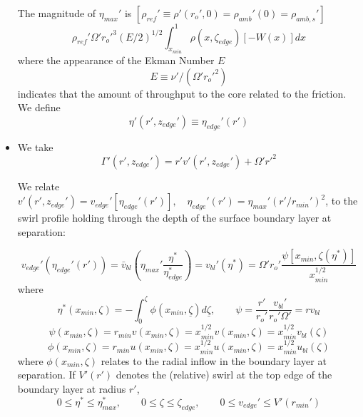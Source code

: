 \documentclass[preprint, prX]{revtex4}
\newcommand{\rmin}{r_{min}}
\newcommand{\xmin}{x_{min}}
\newcommand{\zedge}{z_{edge}}
\begin{document}
\begin{itemize}
The magnitude of $\eta_{max}'$ is $[\rho_{ref}'\equiv \rho'(r_o',0)=\rho_{amb}'(0) = \rho_{amb,s}']$
\begin{equation}
\rho_{ref}'\Omega'r_o'^3 (E/2)^{1/2} \int_{\xmin}^1 \rho(x,\zeta_{edge})[-W(x)]dx
\end{equation}
where the appearance of the Ekman Number $E$
\begin{equation}
E \equiv \nu'/(\Omega'r_o'^2)
\end{equation}
indicates that the amount of throughput to the core related to the friction. We define
\begin{equation}
\eta'(r',\zedge') \equiv \eta_{edge}'(r')
\end{equation}

\item
We take
\begin{equation}
\Gamma'(r',\zedge') = r'v'(r',\zedge') + \Omega'r'^2
\end{equation}

We relate $v'(r',\zedge') = v_{edge}'[\eta_{edge}'(r')], \quad \eta_{edge}'(r') = \eta_{max}'(r' / \rmin')^2$, to the swirl profile holding through the depth of the surface boundary layer at separation:

\begin{equation}
v_{edge}'(\eta_{edge}'(r')) = \bar{v}_{bl}\left( \eta_{max}'\frac{\eta^*}{\eta_{edge}^*}\right) = v_{bl}'(\eta^*) = \Omega' r_o' \frac{\psi[\xmin, \zeta(\eta^*)]}{\xmin^{1/2}}
\end{equation}
where
\begin{equation}
\eta^*(\xmin,\zeta) = -\int_0^\zeta \phi(\xmin,\underline{\zeta})d \underline{\zeta}, \qquad \psi = \frac{r'}{r_o'}\frac{v_{bl}'}{r_o' \Omega'}= r v_{bl}
\end{equation}
\begin{equation}
\psi(\xmin, \zeta) = \rmin v(\xmin,\zeta) = \xmin^{1/2} v(\xmin,\zeta) = \xmin^{1/2} v_{bl} (\zeta)
\end{equation}
\begin{equation}
\phi(\xmin,\zeta) = \rmin u(\xmin, \zeta)  = \xmin^{1/2} u(\xmin, \zeta) = \xmin^{1/2} u_{bl}(\zeta)
\end{equation}
where $\phi(\xmin, \zeta)$ relates to the radial inflow in the boundary layer at separation. If $V'(r')$ denotes the (relative) swirl at the top edge of the boundary layer at radius $r'$,
\begin{equation}
0 \leq \eta^* \leq \eta_{max}^*, \qquad 0 \leq \zeta \leq \zeta_{edge}, \qquad 0 \leq v_{edge}' \leq V'(\rmin')
\end{equation}


\end{itemize}
\end{document}
